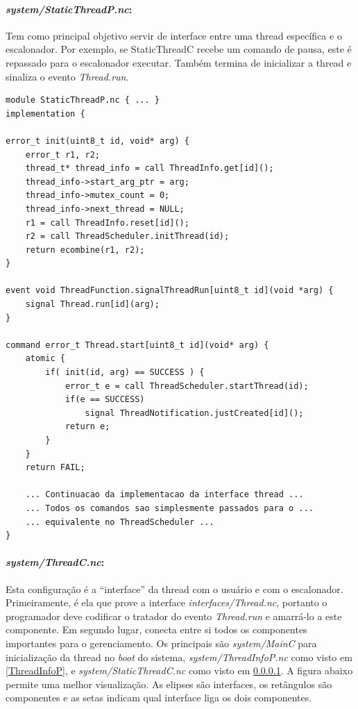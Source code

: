 \paragraph{\textit{system/StaticThreadP.nc}:}\label{StaticThreadC}
Tem como principal objetivo servir de interface entre uma thread específica e o escalonador. Por exemplo, se
StaticThreadC recebe um comando de pausa, este é repassado para o escalonador executar. Também termina de inicializar a
thread e sinaliza o evento \textit{Thread.run}.
\begin{lstlisting}
module StaticThreadP.nc { ... }
implementation {

error_t init(uint8_t id, void* arg) {                                   
    error_t r1, r2;                                                       
    thread_t* thread_info = call ThreadInfo.get[id]();                    
    thread_info->start_arg_ptr = arg;                                     
    thread_info->mutex_count = 0;                                         
    thread_info->next_thread = NULL;                                      
    r1 = call ThreadInfo.reset[id]();                                     
    r2 = call ThreadScheduler.initThread(id);                             
    return ecombine(r1, r2);                                              
}  

event void ThreadFunction.signalThreadRun[uint8_t id](void *arg) {
    signal Thread.run[id](arg);
}

command error_t Thread.start[uint8_t id](void* arg) {
    atomic {
        if( init(id, arg) == SUCCESS ) {
            error_t e = call ThreadScheduler.startThread(id);
            if(e == SUCCESS)
                signal ThreadNotification.justCreated[id]();
            return e;
        }
    }
    return FAIL;

    ... Continuacao da implementacao da interface thread ...
    ... Todos os comandos sao simplesmente passados para o ...
    ... equivalente no ThreadScheduler ...
}

\end{lstlisting}

\paragraph{\textit{system/ThreadC.nc}:}
Esta configuração é a ``interface'' da thread com o usuário e com o escalonador. Primeiramente, é ela que prove a 
interface \textit{interfaces/Thread.nc}, portanto o programador deve codificar o tratador do evento 
\textit{Thread.run} e amarrá-lo a este componente. Em segundo lugar, conecta entre si todos os componentes 
importantes para o gerenciamento. Os principais são \textit{system/MainC} para inicialização da thread no \textit{boot} do sistema,
 \textit{system/ThreadInfoP.nc} como visto em \ref{ThreadInfoP}, e \textit{system/StaticThreadC.nc} como visto em
\ref{StaticThreadC}. A figura abaixo permite uma melhor visualização. As elipses são interfaces, os retângulos são
componentes e as setas indicam qual interface liga os dois componentes.

